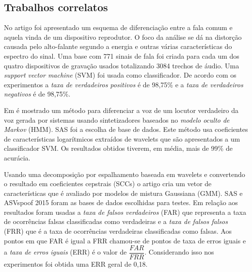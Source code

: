 \begin{myenv}{1.5}

	\section{Trabalhos correlatos}
		\par No artigo \cite{Ren2019} foi apresentado um esquema de diferenciação entre a fala comum e aquela vinda de um dispositivo reprodutor. O foco da análise se dá na distorção causada pelo alto-falante segundo a energia e outras várias características do espectro do sinal. Uma base com 771 sinais de fala foi criada para cada um dos quatro dispositivos de gravação usados totalizando 3084 trechos de áudio. Uma \textit{support vector machine} (SVM) foi usada como classificador. De  acordo com os experimentos a \textit{taxa de verdadeiros positivos} é de 98,75\% e a \textit{taxa de verdadeiros negativos} é de 98,75\%.
		
		\par Em \cite{DiqunYan2019} é mostrado um método para diferenciar a voz de um locutor verdadeiro da voz gerada por sistemas usando sintetizadores baseados no \textit{modelo oculto de Markov} (HMM). SAS\cite{SAS2019} foi a escolha de base de dados. Este método usa coeficientes de características logarítmicos extraídos de wavelets que são apresentados a um classificador SVM. Os resultados obtidos tiverem, em média, mais de 99\% de acurácia.
		
		\par Usando uma decomposição por espalhamento baseada em wavelets e convertendo o resultado em coeficientes cepstrais (SCCs) o artigo \cite{7802552} cria um vetor de características que é avaliado por modelos de mistura Gaussiana (GMM). SAS e ASVspoof 2015 \cite{ASVspoof2015} foram as bases de dados escolhidas para testes. Em relação aos resultados foram usadas a \textit{taxa de falsos verdadeiros} (FAR) que representa a taxa de ocorrências falsas classificadas como verdadeiras e a \textit{taxa de falsos falsos} (FRR) que é a taxa de ocorrências verdadeiras classificadas como falsas. Aos pontos em que FAR é igual a FRR chamou-se de pontos de taxa de erros iguais e a \textit{taxa de erros iguais} (ERR) é o valor de $\dfrac{FAR}{FRR}$. Considerando isso nos experimentos foi obtida uma ERR geral de 0,18.


\end{myenv}
